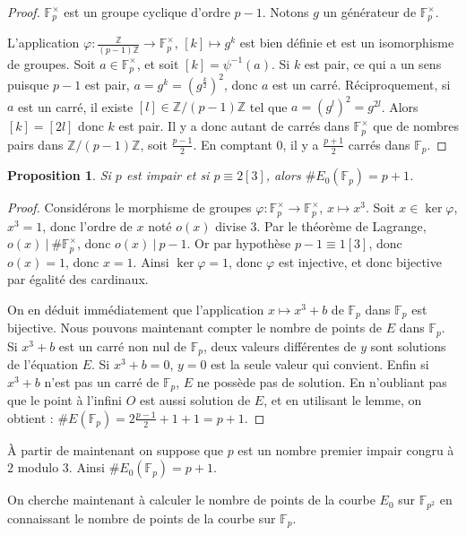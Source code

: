 \documentclass{article}
\theoremstyle{plain}%
\newtheorem{prop}[thm]{Proposition}
\theoremstyle{definition}%
\newcommand{\F}{\mathbb{F}}
\newcommand{\Z}{\mathbb{Z}}
\begin{document}
\begin{proof}
  $\F_{p}^\times$ est un groupe cyclique d'ordre $p-1$. 
  Notons $g$ un générateur de $\F_{p}^\times$. 
  
  L'application $ \varphi \colon \frac{\Z}{(p-1)\Z} \to \F_{p}^\times$,
  $[k] \mapsto g^k$
  est bien définie et est un isomorphisme de groupes.
  Soit $a\in \F_{p}^\times$, et soit $[k] = \psi^{-1}(a)$.
  Si $k$ est pair, ce qui a un sens puisque $p-1$ est pair, $a = g^k = (g^\frac{k}{2})^2$, donc $a$ est un carré.
  Réciproquement, si $a$ est un carré, il existe $[l]\in \Z/(p-1)\Z$ tel que $a = (g^l)^2 = g^{2l}$.
  Alors $[k] = [2l]$ donc $k$ est pair.
  Il y a donc autant de carrés dans $\F_{p}^\times$ que de nombres pairs dans $\Z/{(p-1)\Z}$, soit $\frac{p-1}{2}$. 
  En comptant $0$, il y a $\frac{p+1}{2}$ carrés dans $\F_{p}$. 
\end{proof}

\begin{prop}
  Si $p$ est impair et si $p \equiv 2 [3]$, alors $\#E_0(\F_{p}) = p+1$.
\end{prop}

\begin{proof}
  Considérons le morphisme de groupes $\varphi \colon \F_{p}^\times \to \F_{p}^\times$, $x \mapsto x^3$. 
  Soit $x\in \ker \varphi$, $x^3 = 1$, donc l'ordre de $x$ noté $o(x)$ divise $3$. 
  Par le théorème de Lagrange, $o(x)\ |\ \#\F_{p}^\times$, donc $o(x)\ |\ p-1$. 
  Or par hypothèse $p-1\equiv 1[3]$, donc $o(x) = 1$, donc $x = 1$.
  Ainsi $\ker \varphi = {1}$, donc $\varphi$ est injective, et donc bijective par égalité des cardinaux.

  On en déduit immédiatement que l'application $x \mapsto x^3 + b$ de $\F_{p}$ dans $\F_{p}$ est bijective.
  Nous pouvons maintenant compter le nombre de points de $E$ dans $\F_{p}$. 
  Si $x^3 + b$ est un carré non nul de $\F_{p}$, deux valeurs différentes de $y$ sont solutions de l'équation $E$. 
  Si $x^3 + b = 0$, $y = 0$ est la seule valeur qui convient.
  Enfin si $x^3 + b$ n'est pas un carré de $\F_{p}$, $E$ ne possède pas de solution.
  En n'oubliant pas que le point à l'infini $O$ est aussi solution de $E$, et en utilisant le lemme, on obtient : $\#E(\F_{p}) = 2\frac{p-1}{2} + 1 + 1 = p+1$.
\end{proof}

À partir de maintenant on suppose que $p$ est un nombre premier impair congru à $2$ modulo $3$. 
Ainsi $\#E_0(\F_{p}) = p+1$. 


On cherche maintenant à calculer le nombre de points de la courbe $E_0$ sur $\F_{p^2}$ en connaissant le nombre de points de la courbe sur $\F_{p}$.
\end{document}
